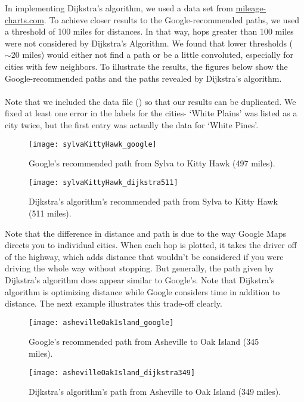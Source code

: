 \documentclass[]{../ncmathy}
\begin{document}
In implementing Dijkstra's algorithm, we used a data set from \href{http://www.mileage-charts.com/chart.php?p=chart&a=NA&b=US&c=NC}{mileage-charts.com}. To achieve closer results to the Google-recommended paths, we used a threshold of 100 miles for distances. In that way, hops greater than 100 miles were not considered by Dijkstra's Algorithm. We found that lower thresholds ($\sim20$ miles) would either not find a path or be a little convoluted, especially for cities with few neighbors. To illustrate the results, the figures below show the Google-recommended paths and the paths revealed by Dijkstra's algorithm. 
\\\\
Note that we included the data file () so that our results can be duplicated. We fixed at least one error in the labels for the cities- `White Plains' was listed as a city twice, but the first entry was actually the data for `White Pines'. 

\begin{figure}[H]
\centering\texttt{[image: sylvaKittyHawk\_google]}
\caption{Google's recommended path from Sylva to Kitty Hawk (497 miles).}
\end{figure}

\begin{figure}[H]
\centering\texttt{[image: sylvaKittyHawk\_dijkstra511]}
\caption{Dijkstra's algorithm's recommended path from Sylva to Kitty Hawk (511 miles).}
\end{figure}

Note that the difference in distance and path is due to the way Google Maps directs you to individual cities. When each hop is plotted, it takes the driver off of the highway, which adds distance that wouldn't be considered if you were driving the whole way without stopping. But generally, the path given by Dijkstra's algorithm does appear similar to Google's. Note that Dijkstra's algorithm is optimizing distance while Google considers time in addition to distance. The next example illustrates this trade-off clearly.

\begin{figure}[H]
\centering\texttt{[image: ashevilleOakIsland\_google]}
\caption{Google's recommended path from Asheville to Oak Island (345 miles).}
\end{figure}
\begin{figure}[H]
\centering\texttt{[image: ashevilleOakIsland\_dijkstra349]}
\caption{Dijkstra's algorithm's path from Asheville to Oak Island (349 miles).}
\end{figure}
\end{document}
